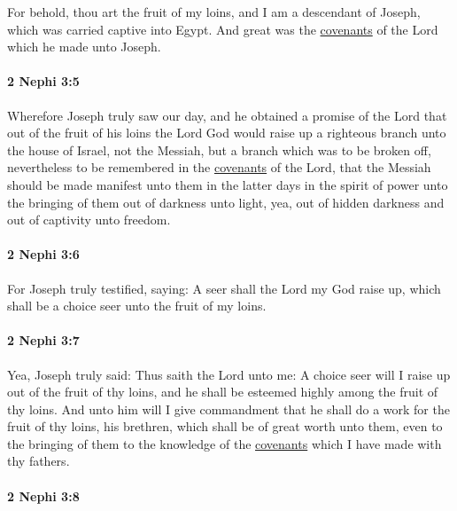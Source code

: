 			For behold, thou art the fruit of my loins,
			and I am a descendant of Joseph, which was carried captive into Egypt.
			And great was the \hyperref[COVENANT]{covenants} of the Lord which he made unto Joseph.

		\paragraph{2 Nephi 3:5} %
			\label{2NEPHI-3-5}

			Wherefore Joseph truly saw our day,
			and he obtained a promise of the Lord
			that out of the fruit of his loins
			the Lord God would raise up a righteous branch unto the house of Israel,
			not the Messiah, but a branch which was to be broken off,
			nevertheless to be remembered in the \hyperref[COVENANT]{covenants} of the Lord,
			that the Messiah should be made manifest unto them in the latter days
			in the spirit of power unto the bringing of them out of darkness unto light,
			yea, out of hidden darkness and out of captivity unto freedom.

		\paragraph{2 Nephi 3:6} %
			\label{2NEPHI-3-6}

			For Joseph truly testified, saying:
			A seer shall the Lord my God raise up,
			which shall be a choice seer unto the fruit of my loins.

		\paragraph{2 Nephi 3:7} %
			\label{2NEPHI-3-7}

			Yea, Joseph truly said:
			Thus saith the Lord unto me:
			A choice seer will I raise up out of the fruit of thy loins,
			and he shall be esteemed highly among the fruit of thy loins.
			And unto him will I give commandment
			that he shall do a work for the fruit of thy loins, his brethren,
			which shall be of great worth unto them,
			even to the bringing of them to the knowledge of the \hyperref[COVENANT]{covenants}
			which I have made with thy fathers.

		\paragraph{2 Nephi 3:8} %
			\label{2NEPHI-3-8}

